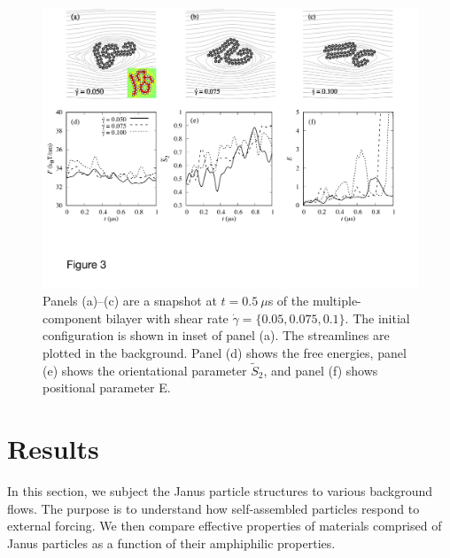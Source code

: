 \documentclass[prb,preprint,showpacs,preprintnumbers,amsmath,amssymb,longbibliography]{revtex4-1}
\begin{document}
\begin{figure}
  \begin{center}
   \includegraphics[width=1.0\textwidth]{Figures/Figure3.pdf}
  \end{center}
  \caption{
    \label{fig:BC1_shear}
    Panels (a)--(c) are a snapshot at $t=0.5\ \mu$s of the
    multiple-component bilayer with shear rate $\dot \gamma = \{0.05,
    0.075, 0.1\}$. The initial configuration is shown in inset of panel
    (a). The streamlines are plotted in the background. Panel (d) shows
    the free energies, panel (e) shows the orientational parameter
    $\tilde{S}_2$, and panel (f) shows positional parameter E.}
\end{figure}



\section{Results}
\label{sec:results}
In this section, we subject the Janus particle structures to various
background flows. The purpose is to understand how self-assembled
particles respond to external forcing. We then compare effective
properties of materials comprised of Janus particles as a function of
their amphiphilic properties.
\end{document}
